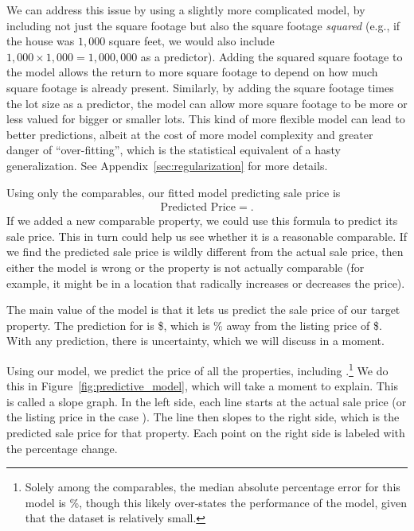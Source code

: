 \documentclass[
12pt, %
letterpaper, %
oneside, %
headinclude,footinclude, %
BCOR5mm, %
]{scrartcl}
\begin{document}
We can address this issue by using a slightly more complicated model, by including not just the square footage but also the square footage \emph{squared} (e.g., if the house was $1,000$ square feet, we would also include $1,000 \times 1,000 = 1,000,000$ as a predictor). 
Adding the squared square footage to the model allows the return to more square footage to depend on how much square footage is already present. 
Similarly, by adding the square footage times the lot size as a predictor, the model can allow more square footage to be more or less valued for bigger or smaller lots. 
This kind of more flexible model can lead to better predictions, albeit at the cost of more model complexity and greater danger of ``over-fitting'', which is the statistical equivalent of a hasty generalization.
See Appendix~\ref{sec:regularization} for more details. 

Using only the comparables, our fitted model predicting sale price is 
\begin{align*}
\mbox{Predicted Price} = .
\end{align*}
If we added a new comparable property, we could use this formula to predict its sale price.
This in turn could help us see whether it is a reasonable comparable. If we find the predicted sale price is wildly different from the actual sale price, then either the model is wrong or the property is not actually comparable (for example, it might be in a location that radically increases or decreases the price). 

The main value of the model is that it lets us predict the sale price of our target property.
The prediction for \PropertyName{} is \$\PropertyPricePredictionComplex{}, which is \PropertyPricePredictionComplexPercent{}\% away from the listing price of \$\PropertyPrice{}.  
With any prediction, there is uncertainty, which we will discuss in a moment. 

Using our model, we predict the price of all the properties, including \PropertyName{}.\footnote{
  Solely among the comparables, the median absolute percentage error for this model is \MAPE{}\%, though this likely over-states the performance of the model, given that the dataset is relatively small. 
}
We do this in Figure~\ref{fig:predictive_model}, which will take a moment to explain.
This is called a slope graph.
In the left side, each line starts at the actual sale price (or the listing price in the case \PropertyName{}).
The line then slopes to the right side, which is the predicted sale price for that property.
Each point on the right side is labeled with the percentage change. 
\end{document}

